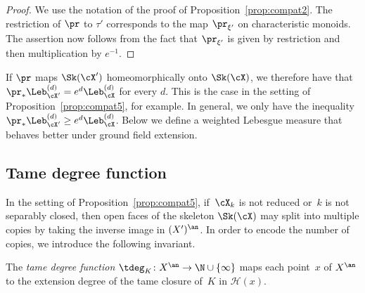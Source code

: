 \begin{proof} We use the notation of the proof of Proposition~\ref{prop:compat2}. The restriction of $\pr$ to $\tau'$ corresponds to the map $\pr_{\xi'}$ on characteristic monoids. The assertion now follows from the fact that $\pr_{\xi'}$ is given by restriction and then multiplication by $e^{-1}$.
\end{proof}
If $\pr$ maps $\Sk(\cX')$ homeomorphically onto $\Sk(\cX)$, we therefore have
that $\pr_*\Leb^{(d)}_{\cX'}=e^d\Leb^{(d)}_\cX$ for every $d$. This is the case
in the setting of Proposition~\ref{prop:compat5}, for example.
In general, we only have the inequality $\pr_*\Leb^{(d)}_{\cX'}\ge e^d\Leb^{(d)}_\cX$. Below we define a weighted Lebesgue measure that behaves better under ground field extension.

\subsection{Tame degree function}\label{ss:tamedeg}
In the setting of Proposition~\ref{prop:compat5}, if~$\cX_k$ is not reduced or~$k$ is not separably closed, then open faces of the skeleton $\Sk(\cX)$ may split into multiple copies by taking the inverse image
in $(X')^{\an}$. In order to encode the number of copies, we introduce the following invariant.
\begin{definition}
The \emph{tame degree function} $\tdeg_K\colon X^{\an}\to \N\cup \{\infty\}$ maps each point~$x$ of $X^{\an}$ to the extension degree of the tame closure of~$K$ in $\mathscr{H}(x)$.
\end{definition}

